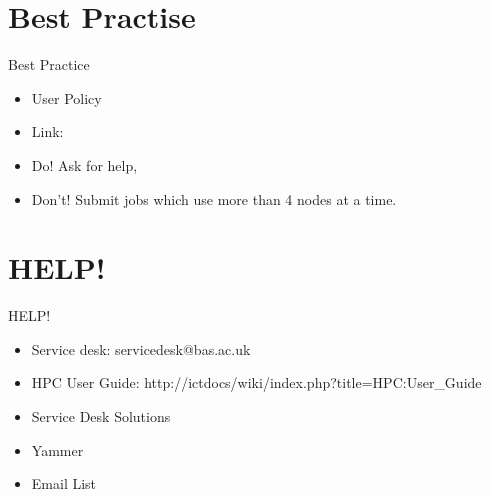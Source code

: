 {
\section{Best Practise}
%
\begin{frame}{Best Practice}
\begin{itemize}
\item User Policy
\item Link:
\item Do! Ask for help,
\item Don't! Submit jobs which use more than 4 nodes at a time.
\end{itemize}
\end{frame}
}

{
\section{HELP!}
%
\begin{frame}{HELP!}
\begin{itemize}
\item Service desk: servicedesk@bas.ac.uk
\item HPC User Guide: http://ictdocs/wiki/index.php?title=HPC:User_Guide
\item Service Desk Solutions
\item Yammer
\item Email List
\end{itemize}
\end{frame}
}
